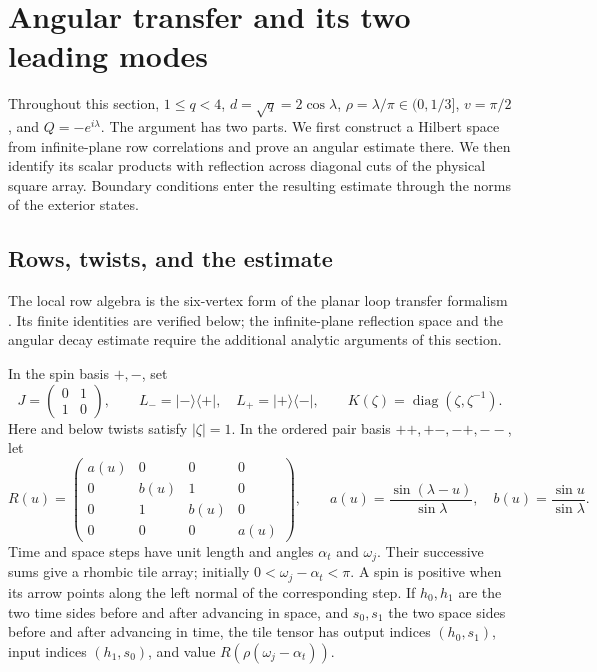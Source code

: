 \section{Angular transfer and its two leading modes}\label{sec:angular}

Throughout this section, $1\le q<4$, $d=\sqrt q=2\cos\lambda$,
$\rho=\lambda/\pi\in(0,1/3]$, $v=\pi/2$, and $Q=-e^{i\lambda}$.
The argument has two parts. We first construct a Hilbert space from
infinite-plane row correlations and prove an angular estimate there. We
then identify its scalar products with reflection across diagonal cuts
of the physical square array. Boundary conditions enter the resulting
estimate through the norms of the exterior states.

\subsection{Rows, twists, and the estimate}

The local row algebra is the six-vertex form of the planar loop
transfer formalism \citep{TemperleyLieb1971,BaxterKellandWu1976}.
Its finite identities are verified below; the infinite-plane
reflection space and the angular decay estimate require the additional
analytic arguments of this section.

In the spin basis $+,-$, set
\[
 J=\begin{pmatrix}0&1\\1&0\end{pmatrix},\qquad
 L_-=|-\rangle\langle+|,\quad L_+=|+\rangle\langle-|,
 \qquad K(\zeta)=\operatorname{diag}(\zeta,\zeta^{-1}).
\]
Here and below twists satisfy $|\zeta|=1$. In the ordered pair basis
$++,+-,-+,--$, let
\begin{equation}\label{bulk:R}
 R(u)=\begin{pmatrix}
 a(u)&0&0&0\\0&b(u)&1&0\\0&1&b(u)&0\\0&0&0&a(u)
 \end{pmatrix},\qquad
 a(u)=\frac{\sin(\lambda-u)}{\sin\lambda},\quad
 b(u)=\frac{\sin u}{\sin\lambda}.
\end{equation}
Time and space steps have unit length and angles $\alpha_t$ and
$\omega_j$. Their successive sums give a rhombic tile array; initially
$0<\omega_j-\alpha_t<\pi$. A spin is positive when its arrow points
along the left normal of the corresponding step. If $h_0,h_1$ are the
two time sides before and after advancing in space, and $s_0,s_1$ the
two space sides before and after advancing in time, the tile tensor
has output indices $(h_0,s_1)$, input indices $(h_1,s_0)$, and value
$R(\rho(\omega_j-\alpha_t))$.

